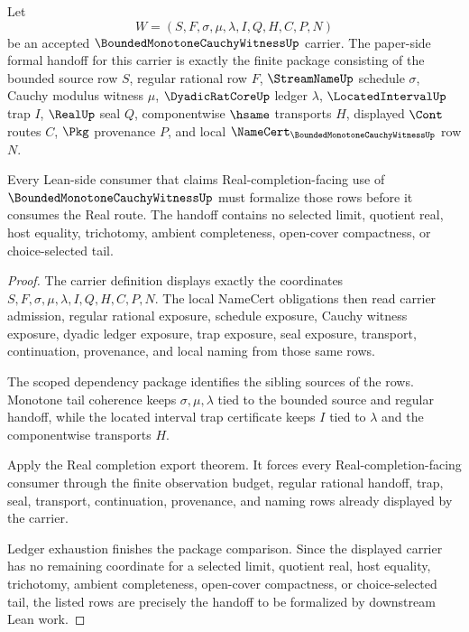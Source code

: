 \begin{theorem}
\label{thm:bounded-monotone-cauchy-witness-formal-handoff-package}
Let
$$
W=(S,F,\sigma,\mu,\lambda,I,Q,H,C,P,N)
$$
be an accepted $\BoundedMonotoneCauchyWitnessUp$ carrier. The paper-side formal handoff for this carrier is exactly the finite package consisting of the bounded source row $S$, regular rational row $F$, $\StreamNameUp$ schedule $\sigma$, Cauchy modulus witness $\mu$, $\DyadicRatCoreUp$ ledger $\lambda$, $\LocatedIntervalUp$ trap $I$, $\RealUp$ seal $Q$, componentwise $\hsame$ transports $H$, displayed $\Cont$ routes $C$, $\Pkg$ provenance $P$, and local $\NameCert_{\BoundedMonotoneCauchyWitnessUp}$ row $N$.

Every Lean-side consumer that claims Real-completion-facing use of $\BoundedMonotoneCauchyWitnessUp$ must formalize those rows before it consumes the Real route. The handoff contains no selected limit, quotient real, host equality, trichotomy, ambient completeness, open-cover compactness, or choice-selected tail.
\end{theorem}
\begin{proof}
The carrier definition displays exactly the coordinates $S,F,\sigma,\mu,\lambda,I,Q,H,C,P,N$. The local NameCert obligations then read carrier admission, regular rational exposure, schedule exposure, Cauchy witness exposure, dyadic ledger exposure, trap exposure, seal exposure, transport, continuation, provenance, and local naming from those same rows.

The scoped dependency package identifies the sibling sources of the rows. Monotone tail coherence keeps $\sigma,\mu,\lambda$ tied to the bounded source and regular handoff, while the located interval trap certificate keeps $I$ tied to $\lambda$ and the componentwise transports $H$.

Apply the Real completion export theorem. It forces every Real-completion-facing consumer through the finite observation budget, regular rational handoff, trap, seal, transport, continuation, provenance, and naming rows already displayed by the carrier.

Ledger exhaustion finishes the package comparison. Since the displayed carrier has no remaining coordinate for a selected limit, quotient real, host equality, trichotomy, ambient completeness, open-cover compactness, or choice-selected tail, the listed rows are precisely the handoff to be formalized by downstream Lean work.
\end{proof}

